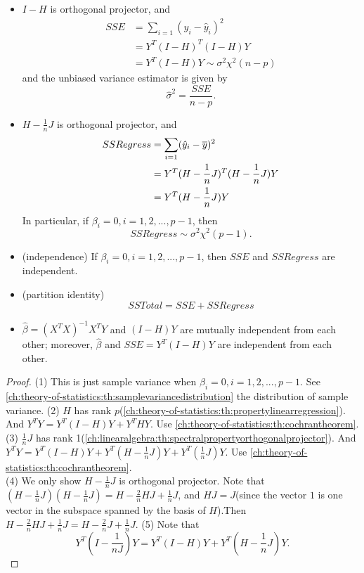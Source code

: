 \begin{refsection}
\begin{theorem}
\begin{itemize}
		\item $I-H$ is orthogonal projector, and 
		\begin{align*}
		SSE&= \sum_{i=1} (y_i - \hat{y}_i)^2\\
		&=Y^T(I-H)^T(I - H)Y\\
		&=Y^T(I - H)Y \sim \sigma^2 \chi^2(n-p)
		\end{align*}
		and the unbiased variance estimator is given by
		$$\hat{\sigma}^2 = \frac{SSE}{n-p}.$$
		\item $H-\frac{1}{n}J$ is orthogonal projector, and 
		\begin{align*}
		SSRegress &= \sum_{i=1} (\hat{y}_i - \overline{y})^2\\
		&=Y^T(H - \frac{1}{n}J)^T(H - \frac{1}{n}J) Y \\
		&=Y^T(H - \frac{1}{n}J) Y 
		\end{align*}
		In particular, if $\beta_i = 0,i=1,2,...,p-1$, then
		$$SSRegress \sim \sigma^2 \chi^2(p-1).$$	
		\item (independence) If $\beta_i = 0,i=1,2,...,p-1$, then
		$SSE$ and $SSRegress$ are independent.
		\item (partition identity)
		$$SSTotal = SSE + SSRegress$$
		\item $\hat{\beta} = (X^TX)^{-1}X^TY$ and $(I-H)Y$ are mutually independent from each other; moreover, $\hat{\beta}$ and $SSE = Y^T(I-H)Y$ are independent from each other.
	\end{itemize}
\end{theorem}
\begin{proof}
	(1) This is just sample variance when $\beta_i=0,i=1,2,...,p-1$. See \autoref{ch:theory-of-statistics:th:samplevariancedistribution} the distribution of sample variance.
	(2) $H$ has rank $p$(\autoref{ch:theory-of-statistics:th:propertylinearregression}). And $Y^TY = Y^T(I - H)Y + Y^THY$. Use \autoref{ch:theory-of-statistics:th:cochrantheorem}. 
	(3) $\frac{1}{n}J$ has rank 1(\autoref{ch:linearalgebra:th:spectralpropertyorthogonalprojector}). 
	And $Y^TY = Y^T(I - H)Y + Y^T(H -\frac{1}{n}J) Y + Y^T(\frac{1}{n}J) Y$. Use \autoref{ch:theory-of-statistics:th:cochrantheorem}.\\
	(4) We only show $H-\frac{1}{n}J$ is orthogonal projector. Note that $(H-\frac{1}{n}J)(H-\frac{1}{n}J) = H-\frac{2}{n}HJ + \frac{1}{n}J$, and $HJ = J$(since the vector $1$ is one vector in the subspace spanned by the basis of $H$).Then $ H-\frac{2}{n}HJ + \frac{1}{n}J = H-\frac{2}{n}J + \frac{1}{n}J$.
	(5) Note that
	$$Y^T(I-\frac{1}{nJ})Y = Y^T(I-H)Y + Y^T(H-\frac{1}{n}J)Y.$$

\end{proof}
\end{refsection}
